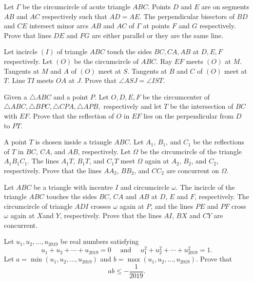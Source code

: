 \documentclass[11pt]{scrartcl}
\begin{document}
\begin{problem}[625002281186392279]
	Let $\Gamma$ be the circumcircle of acute triangle $ABC$. Points $D$ and $E$ are on segments $AB$ and $AC$ respectively such that $AD = AE$. The perpendicular bisectors of $BD$ and $CE$ intersect minor arcs $AB$ and $AC$ of $\Gamma$ at points $F$ and $G$ respectively. Prove that lines $DE$ and $FG$ are either parallel or they are the same line.
\end{problem}
\begin{problem}[8972547734710795566]
Let incircle $(I)$ of triangle $ABC$ touch the sides $BC,CA,AB$ at $D,E,F$ respectively. Let $(O)$ be the circumcircle of $ABC$. Ray $EF$ meets $(O)$ at $M$. Tangents at $M$ and $A$ of $(O)$ meet at $S$. Tangents at $B$ and $C$ of $(O)$ meet at $T$. Line $TI$ meets $OA$ at $J$. Prove that $\angle ASJ=\angle IST$.
\end{problem}
\begin{problem}[8569243655022492300]
	Given a $ \triangle ABC $ and a point $ P. $ Let $ O, D, E, F $ be the circumcenter of $ \triangle ABC, \triangle BPC, \triangle CPA, \triangle APB, $ respectively and let $ T $ be the intersection of $ BC $ with $ EF. $ Prove that the reflection of $ O $ in $ EF $ lies on the perpendicular from $ D $ to $ PT. $
\end{problem}
\begin{problem}[2918584823978789760]
A point $T$ is chosen inside a triangle $ABC$. Let $A_1$, $B_1$, and $C_1$ be the reflections of $T$ in $BC$, $CA$, and $AB$, respectively. Let $\Omega$ be the circumcircle of the triangle $A_1B_1C_1$. The lines $A_1T$, $B_1T$, and $C_1T$ meet $\Omega$ again at $A_2$, $B_2$, and $C_2$, respectively. Prove that the lines $AA_2$, $BB_2$, and $CC_2$ are concurrent on $\Omega$.
\end{problem}
\begin{problem}[7553717274310387624]
Let $ABC$ be a triangle with incentre $I$ and circumcircle $\omega$. The incircle of the triangle $ABC$
touches the sides $BC$, $CA$ and $AB$ at $D$, $E$ and $F$, respectively. The circumcircle of triangle $ADI$ crosses $\omega$ again at $P$, and the lines $PE$ and $PF$ cross $\omega$ again at $X$and $Y$, respectively. Prove that the lines $AI$, $BX$ and $CY$ are concurrent.
\end{problem}
\begin{problem}[3192129869376364982]
Let $u_1, u_2, \dots, u_{2019}$ be real numbers satisfying\[u_{1}+u_{2}+\cdots+u_{2019}=0 \quad \text { and } \quad u_{1}^{2}+u_{2}^{2}+\cdots+u_{2019}^{2}=1.\]Let $a=\min \left(u_{1}, u_{2}, \ldots, u_{2019}\right)$ and $b=\max \left(u_{1}, u_{2}, \ldots, u_{2019}\right)$. Prove that
\[
a b \leqslant-\frac{1}{2019}.
\]
\end{problem}
\end{document}
